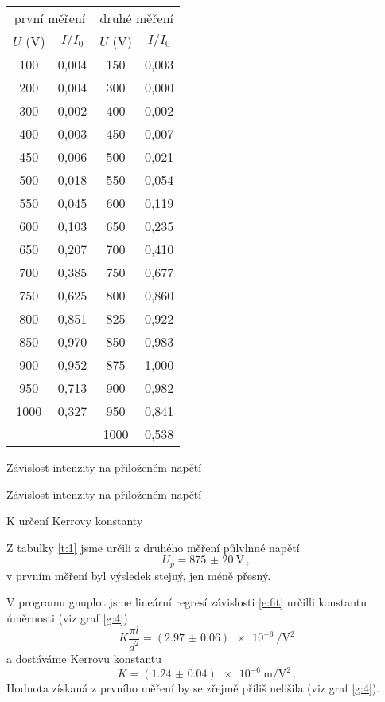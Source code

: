 \begin{tabulka}[htbp]
\centering
\begin{tabular}{cc|cc}
\multicolumn{2}{c|}{první měření} & \multicolumn{2}{c}{druhé měření} \\
$U$ (\si{\volt}) & $I/I_0$ & $U$ (\si{\volt}) & $I/I_0$ \\ \hline
100 & 0,004 & 150 & 0,003 \\ 
200 & 0,004 & 300 & 0,000 \\ 
300 & 0,002 & 400 & 0,002 \\ 
400 & 0,003 & 450 & 0,007 \\ 
450 & 0,006 & 500 & 0,021 \\ 
500 & 0,018 & 550 & 0,054 \\ 
550 & 0,045 & 600 & 0,119 \\ 
600 & 0,103 & 650 & 0,235 \\ 
650 & 0,207 & 700 & 0,410 \\ 
700 & 0,385 & 750 & 0,677 \\ 
750 & 0,625 & 800 & 0,860 \\ 
800 & 0,851 & 825 & 0,922 \\ 
850 & 0,970 & 850 & 0,983 \\ 
900 & 0,952 & 875 & 1,000 \\ 
950 & 0,713 & 900 & 0,982 \\ 
1000 & 0,327 & 950 & 0,841 \\ 
 &  & 1000 & 0,538 \\ 

\end{tabular}
\caption{Závislost intenzity na přiloženém napětí}
\label{t:1}
\end{tabulka}

\begin{graph}[htbp] 
\centering

\caption{Závislost intenzity na přiloženém napětí}
\label{g:3}
\end{graph}

\begin{graph}[htbp] 
\centering

\caption{K určení Kerrovy konstanty}
\label{g:4}
\end{graph}

Z tabulky \ref{t:1} jsme určili z druhého měření půlvlnné napětí
\begin{equation*}
U_p=\SI{875(20)}{\volt} \,,
\end{equation*}
v prvním měření byl výsledek stejný, jen méně přesný.

V programu gnuplot jsme lineární regresí závislosti \eqref{e:fit} určilli konstantu úměrnosti (viz graf \ref{g:4})
\begin{equation*}
K \frac{\pi l}{d^2} = (\num{2.97(6)})\SI{e-6}{\per\volt\squared}
\end{equation*}
a dostáváme Kerrovu konstantu
\begin{equation*}
K = (\num{1.24(4)})\SI{e-6}{\metre\per\volt\squared} \,.
\end{equation*}
Hodnota získaná z prvního měření by se zřejmě příliš nelišila (viz graf \ref{g:4}).